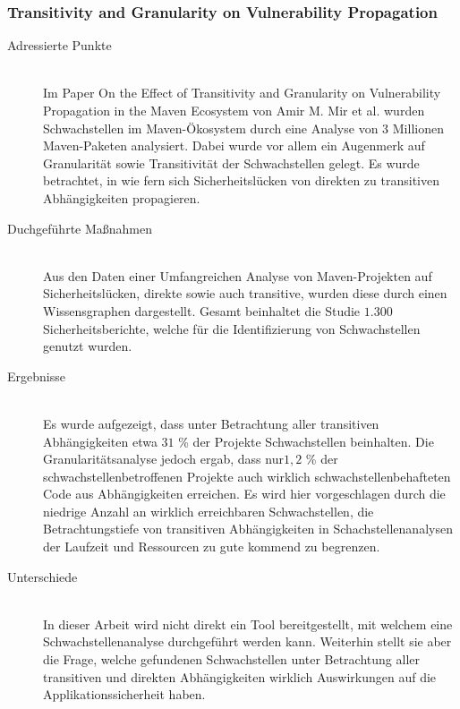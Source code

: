 \subsubsection{Transitivity and Granularity on Vulnerability Propagation} \label{sec:Transitivity}
    \begin{description}
        \item[Adressierte Punkte]\hfill \\
            Im Paper \glqq On the Effect of Transitivity and Granularity on Vulnerability Propagation in the Maven Ecosystem\grqq\textsuperscript{\cite{article:OnTheEffect10123571}} von Amir M. Mir et al. wurden Schwachstellen im Maven-Ökosystem\textsuperscript{\cite{link:Maven}} durch eine Analyse von $3$ Millionen Maven-Paketen analysiert.
            Dabei wurde vor allem ein Augenmerk auf Granularität sowie Transitivität der Schwachstellen gelegt.
            Es wurde betrachtet, in wie fern sich Sicherheitslücken von direkten zu transitiven Abhängigkeiten propagieren.
        \item[Duchgeführte Maßnahmen]\hfill \\
            Aus den Daten einer Umfangreichen Analyse von Maven-Projekten auf Sicherheitslücken, direkte sowie auch transitive, wurden diese durch einen Wissensgraphen dargestellt.
            Gesamt beinhaltet die Studie $1.300$ Sicherheitsberichte, welche für die Identifizierung von Schwachstellen genutzt wurden.
        \item[Ergebnisse]\hfill \\
            Es wurde aufgezeigt, dass unter Betrachtung aller transitiven Abhängigkeiten etwa $31$ \% der Projekte Schwachstellen beinhalten.
            Die Granularitätsanalyse jedoch ergab, dass nur\linebreak[4]$1,2$ \% der schwachstellenbetroffenen Projekte auch wirklich schwachstellenbehafteten Code aus Abhängig\-keiten erreichen.
            Es wird hier vorgeschlagen durch die niedrige Anzahl an wirklich erreichbaren Schwachstellen, die Betrachtungstiefe von transitiven Abhängigkeiten in Schachstellenanalysen der Laufzeit und Ressourcen zu gute kommend zu begrenzen.
        \item[Unterschiede]\hfill \\
            In dieser Arbeit wird nicht direkt ein Tool bereitgestellt, mit welchem eine Schwachstellenanalyse durchgeführt werden kann.
            Weiterhin stellt sie aber die Frage, welche gefundenen Schwachstellen unter Betrachtung aller transitiven und direkten Abhängigkeiten wirklich Auswirkungen auf die Applikationssicherheit haben.
    \end{description}